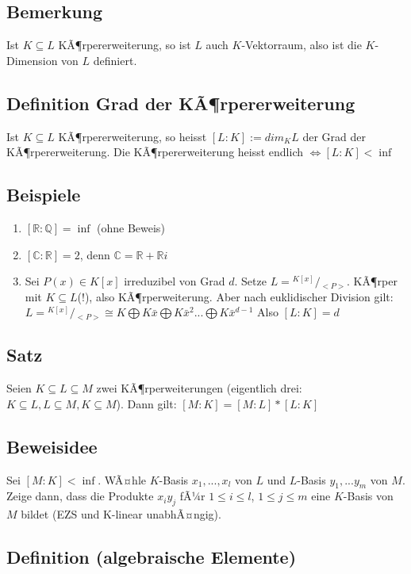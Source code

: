 \documentclass[12pt,a4paper,ngerman]{scrreprt}
\newcommand{\modulus}[2]{{}^{#1} \!/\!_{#2}}
\begin{document}
\subsection{Bemerkung}
Ist $K \subseteq L$ KÃ¶rpererweiterung, so ist $L$ auch $K$-Vektorraum, 
also ist die $K$-Dimension von $L$ definiert. 

\subsection{Definition Grad der KÃ¶rpererweiterung}

Ist $K \subseteq L$ KÃ¶rpererweiterung, so heisst $[L:K] := dim_KL$ der Grad der KÃ¶rpererweiterung.
Die KÃ¶rpererweiterung heisst endlich $\Leftrightarrow [L:K] < \inf$

\subsection{Beispiele}
\begin{enumerate}[]
\item $[\mathbb{R}:\mathbb{Q}] = \inf$ (ohne Beweis)
\item $[\mathbb{C}:\mathbb{R}] = 2$, denn $\mathbb{C} = \mathbb{R} + \mathbb{R}i$
\item Sei $P(x) \in K[x]$ irreduzibel von Grad $d$. 
Setze $L = \modulus{K[x]}{<P>}$. KÃ¶rper mit $K \subseteq L$(!), also KÃ¶rperweiterung. 
Aber nach euklidischer Division gilt: 
$L = \modulus{K[x]}{<P>} \cong K \bigoplus K\bar{x} \bigoplus K\bar{x}^2 ... \bigoplus K\bar{x}^{d-1}$
Also $[L:K] = d$
\end{enumerate}

\subsection{Satz}
Seien $K \subseteq L \subseteq M$ zwei KÃ¶rperweiterungen (eigentlich drei: $K \subseteq L, L \subseteq M, K \subseteq M$).
Dann gilt: $[M:K] = [M:L] * [L:K]$

\subsection{Beweisidee}

Sei $[M:K] < \inf$. WÃ¤hle $K$-Basis $x_1, ..., x_l$ von $L$ und $L$-Basis $y_1, ... y_m$ von $M$.
Zeige dann, dass die Produkte $x_iy_j$ fÃ¼r $1 \leq i \leq l$, $1 \leq j \leq m$ 
eine $K$-Basis von $M$ bildet (EZS und K-linear unabhÃ¤ngig).

\subsection{Definition (algebraische Elemente)}
\end{document}
